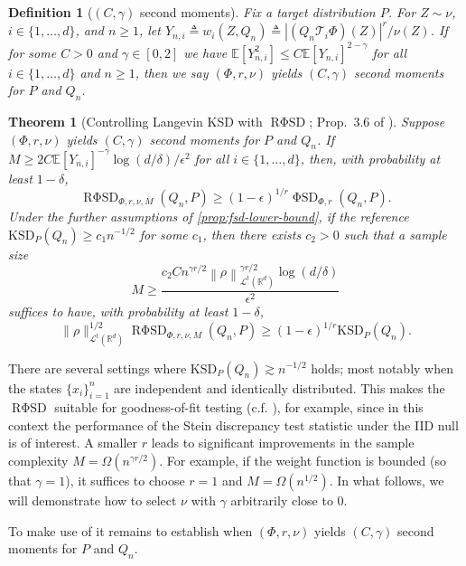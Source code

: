 \documentclass[12pt,paper=letter]{scrreprt}
\newtheorem{theorem}{Theorem}[chapter]
\newtheorem{definition}{Definition}[chapter]
\newcommand{\eps}{\epsilon}
\def\defeq{\triangleq} %
\def\defined{\defeq} %
\def\norm#1{\left\|{#1}\right\|} %
\def\staticnorm#1{\|{#1}\|} %
\newcommand{\dist}{\sim}
\newcommand{\EE}{\mathbb{E}}	%
\newcommand{\feat}{\Phi} %
\newcommand{\FSD}{\ensuremath{\operatorname{\mathrm{\Phi}SD}}\xspace}
\newcommand{\RFSD}{\ensuremath{\operatorname{R\mathrm{\Phi}SD}}\xspace}
\newcommand{\isdist}{\nu}
\newcommand{\targetdist}{P}
\begin{document}
\begin{definition}[$(C,\gamma)$ second moments] \label{defn:second-moment-property}
Fix a target distribution $\targetdist$.
For $Z \dist \isdist$, $i \in \{1,\dots,d\}$, and $n \ge 1$, let $Y_{n,i} \defined w_i(Z, Q_n) \defined  |(Q_n \mathcal{T}_i \Phi)(Z)|^r/\nu(Z)$. %
If for some $C > 0$ and $\gamma \in [0,2]$ we have
$
\EE[Y_{n,i}^2] \le C \EE[Y_{n,i}]^{2-\gamma}
$
for all $i \in \{1 , \dots , d\}$ and $n \ge 1$,
then we say \emph{$(\feat, r, \isdist)$ yields $(C, \gamma)$ second moments for $P$ and $Q_n$}. 
\end{definition}
\begin{theorem}[Controlling Langevin KSD with $\RFSD$; Prop.~3.6 of \citealp{huggins2018random}] \label{prop:estimated-ksd-lb-guarantee}
Suppose $(\feat,r,\isdist)$ yields $(C,\gamma)$ second moments for $P$ and $Q_n$.
If $M \ge 2C\EE[Y_{n,i}]^{-\gamma}\log(d/\delta)/\eps^2$ for all $i \in \{1 , \dots , d\}$, then,
with probability at least $1-\delta$, 
\[
\RFSD_{\feat,r,\isdist,M}(Q_n, P)
	\ge (1-\eps)^{1/r}\FSD_{\feat,r}(Q_n , \targetdist).
\]
Under the further assumptions of \cref{prop:fsd-lower-bound}, if the reference $\mathrm{KSD}_P(Q_n) \geq c_1 n^{-1/2}$ for some $c_1$, then there exists $c_2 > 0$ such that a sample size 
$$
M \geq \frac{c_2 C n^{\gamma r/2} \norm{\rho}_{\mathcal{L}^t(\mathbb{R}^d)}^{\gamma r/2}\log(d/\delta)}{\eps^2}
$$ 
suffices to have, with probability at least $1-\delta$,  
\[
\staticnorm{\rho}_{\mathcal{L}^t(\mathbb{R}^d)}^{1/2}\RFSD_{\feat,r,\isdist,M}(Q_n , \targetdist)
	\ge (1-\eps)^{1/r} \mathrm{KSD}_P(Q_n).
\]
\end{theorem}

\noindent There are several settings where $\mathrm{KSD}_P(Q_n) \gtrsim n^{-1/2}$ holds; most notably when the states $\{x_i\}_{i=1}^n$ are independent and identically distributed.
This makes the $\RFSD$ suitable for goodness-of-fit testing (c.f. ), for example, since in this context the performance of the Stein discrepancy test statistic under the IID null is of interest.
A smaller $r$ leads to significant improvements in the sample complexity $M = \Omega(n^{\gamma r / 2})$. 
For example, if the weight function is bounded (so that $\gamma = 1$), it suffices to choose $r=1$ and $M = \Omega(n^{1/2})$. In what follows, we will demonstrate how to select $\nu$ with $\gamma$ 
arbitrarily close to 0. 



To make use of  it remains to establish when $(\feat,r,\isdist)$ yields $(C,\gamma)$ second moments for $P$ and $Q_n$.
\end{document}
